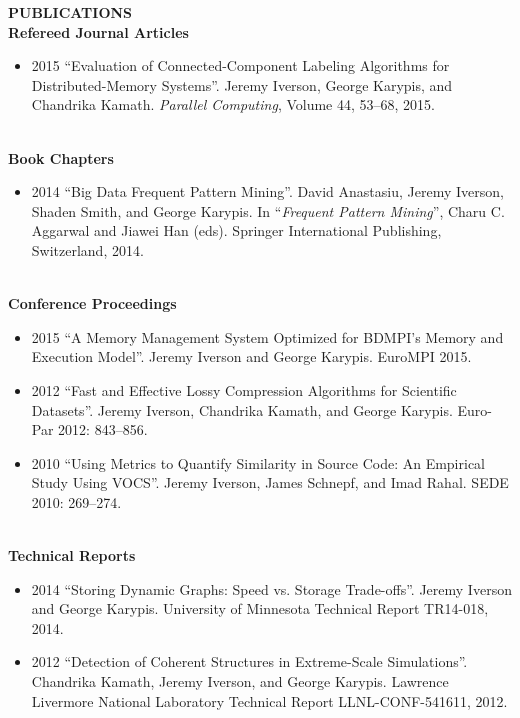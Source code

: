 \documentclass[a4paper,12pt]{article}
\newcommand{\lskip}[1]{\hspace*{1em}\\[#1\baselineskip]}
\newenvironment{Itemize}[0]{
  \vspace{-\parskip}\begin{itemize}
}{
  \end{itemize}
}
\begin{document}
\textbf{PUBLICATIONS}
\lskip{1}
%
\textbf{Refereed Journal Articles}
\begin{Itemize}
  \item[2015] ``Evaluation of Connected-Component Labeling Algorithms for
              Distributed-Memory Systems''. Jeremy Iverson, George Karypis, and
              Chandrika Kamath. \textit{Parallel Computing}, Volume 44, 53--68,
              2015.
\end{Itemize}
%
\lskip{-2}
%
\textbf{Book Chapters}
\begin{Itemize}
  \item[2014] ``Big Data Frequent Pattern Mining''. David Anastasiu, Jeremy
              Iverson, Shaden Smith, and George Karypis. In ``\textit{Frequent
              Pattern Mining}'', Charu C. Aggarwal and Jiawei Han (eds).
              Springer International Publishing, Switzerland, 2014.
\end{Itemize}
%
\lskip{-2}
%
\textbf{Conference Proceedings}
\begin{Itemize}
  \item[2015] ``A Memory Management System Optimized for BDMPI's Memory and
              Execution Model''. Jeremy Iverson and George Karypis. EuroMPI
              2015.
  \item[2012] ``Fast and Effective Lossy Compression Algorithms for Scientific
              Datasets''. Jeremy Iverson, Chandrika Kamath, and George Karypis.
              Euro-Par 2012: 843--856.
  \item[2010] ``Using Metrics to Quantify Similarity in Source Code: An
              Empirical Study Using VOCS''. Jeremy Iverson, James Schnepf, and
              Imad Rahal. SEDE 2010: 269--274.
\end{Itemize}
%
\lskip{-2}
%
\textbf{Technical Reports}
\begin{Itemize}
  \item[2014] ``Storing Dynamic Graphs: Speed vs. Storage Trade-offs''. Jeremy
              Iverson and George Karypis. University of Minnesota Technical
              Report TR14-018, 2014. %
  \item[2012] ``Detection of Coherent Structures in Extreme-Scale
              Simulations''. Chandrika Kamath, Jeremy Iverson, and George
              Karypis. Lawrence Livermore National Laboratory Technical Report
              LLNL-CONF-541611, 2012.
\end{Itemize}
\end{document}
